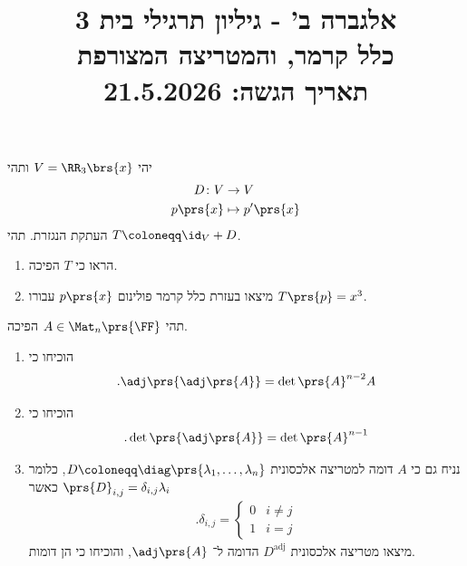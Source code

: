 \documentclass[a4paper,10pt,twoside,openany]{article}
\title{
אלגברה ב' - גיליון תרגילי בית 3 \\
כלל קרמר, והמטריצה המצורפת
\\
\vspace{1cm}
\large{תאריך הגשה: 21.5.2026}
}
\date{}
\begin{document}
\maketitle

\begin{exercise}
יהי
$V = \RR_3\brs{x}$
ותהי
\begin{align*}
D \colon V &\to V \\
p\prs{x} &\mapsto p'\prs{x}
\end{align*}
העתקת הנגזרת.
תהי
$T \coloneqq \id_V + D$.

\begin{enumerate}
\item הראו כי
$T$
הפיכה.

\item מיצאו בעזרת כלל קרמר פולינום
$p\prs{x}$
עבורו
$T\prs{p} = x^3$.
\end{enumerate}
\end{exercise}

\begin{exercise}
תהי
$A \in \Mat_n\prs{\FF}$
הפיכה.
\begin{enumerate}
\item הוכיחו כי
\[\text{.} \adj\prs{\adj\prs{A}} = \det\prs{A}^{n-2} A\]

\item הוכיחו כי
\[\text{.} \det\prs{\adj\prs{A}} = \det\prs{A}^{n-1}\]

\item נניח גם כי
$A$
דומה למטריצה אלכסונית
$D \coloneqq \diag\prs{\lambda_1, \ldots, \lambda_n}$,
כלומר
$\prs{D}_{i,j} = \delta_{i,j} \lambda_i$
כאשר
\begin{align*}
\text{.} \delta_{i,j} = \begin{cases}
0 & i \neq j \\
1 & i = j
\end{cases}
\end{align*}
מיצאו מטריצה אלכסונית
$D^{\mathrm{adj}}$
הדומה ל־%
$\adj\prs{A}$,
והוכיחו כי הן דומות.
\end{enumerate}
\end{exercise}
\end{document}
